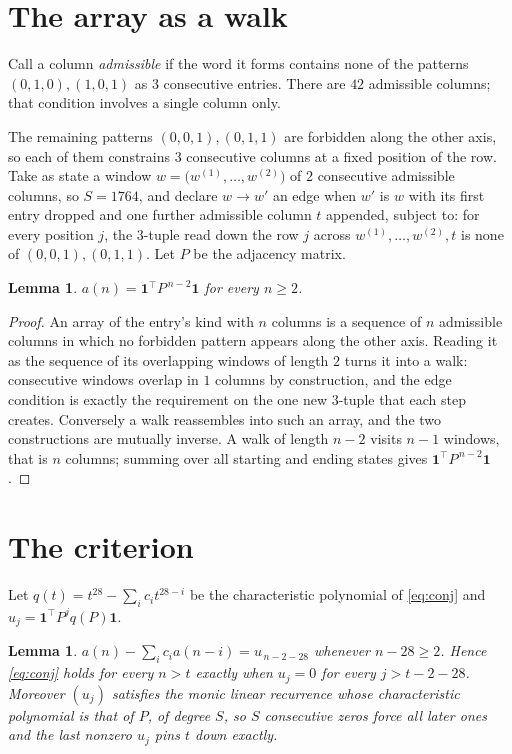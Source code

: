 \documentclass[11pt,a4paper]{article}
\theoremstyle{plain}
\newtheorem{lemma}[theorem]{Lemma}
\theoremstyle{definition}
\begin{document}
\section{The array as a walk}

Call a column \emph{admissible} if the word it forms contains none of the patterns
$(0,1,0), (1,0,1)$ as $3$ consecutive entries. There are $42$ admissible columns; that condition
involves a single column only.

The remaining patterns $(0,0,1), (0,1,1)$ are forbidden along the other axis, so each of them
constrains $3$ consecutive columns at a fixed position of the row. Take as state a
window $w=\bigl(w^{(1)},\dots,w^{(2)}\bigr)$ of $2$ consecutive admissible
columns, so $S=1764$, and declare $w\to w'$ an edge when $w'$ is $w$ with its first entry
dropped and one further admissible column $t$ appended, subject to: for every position
$j$, the $3$-tuple read down the row $j$ across $w^{(1)},\dots,w^{(2)},t$
is none of $(0,0,1), (0,1,1)$. Let $P$ be the adjacency matrix.

\begin{lemma}\label{lem:walk}
$a(n)=\mathbf{1}^{\!\top}P^{\,n-2}\mathbf{1}$ for every $n\ge2$.
\end{lemma}

\begin{proof}
An array of the entry's kind with $n$ columns is a sequence of $n$ admissible columns in
which no forbidden pattern appears along the other axis. Reading it as the sequence of its
overlapping windows of length $2$ turns it into a walk: consecutive windows overlap in
$1$ columns by construction, and the edge condition is exactly the requirement on the one
new $3$-tuple that each step creates. Conversely a walk reassembles into such an array,
and the two constructions are mutually inverse. A walk of length $n-2$ visits $n-1$
windows, that is $n$ columns; summing over all starting and ending states gives
$\mathbf{1}^{\!\top}P^{\,n-2}\mathbf{1}$.
\end{proof}

\section{The criterion}

Let $q(t)=t^{28}-\sum_i c_i t^{28-i}$ be the characteristic polynomial of
\eqref{eq:conj} and $u_j=\mathbf{1}^{\!\top}P^{j}q(P)\mathbf{1}$.

\begin{lemma}\label{lem:crit}
$a(n)-\sum_i c_i a(n-i)=u_{\,n-2-28}$ whenever $n-28\ge2$. Hence
\eqref{eq:conj} holds for every $n>t$ exactly when $u_j=0$ for every
$j>t-2-28$. Moreover $(u_j)$ satisfies the monic linear recurrence whose
characteristic polynomial is that of $P$, of degree $S$, so $S$ consecutive zeros force all
later ones and the last nonzero $u_j$ pins $t$ down exactly.
\end{lemma}
\end{document}
